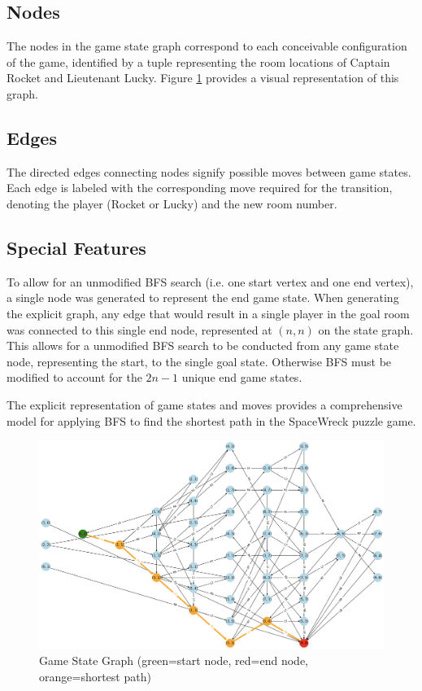 \documentclass[12pt]{exam}
\begin{document}
\subsection*{Nodes}
The nodes in the game state graph correspond to each conceivable configuration of the game, identified by a tuple representing the room locations of Captain Rocket and Lieutenant Lucky. Figure \ref{fig:game_state_graph} provides a visual representation of this graph.

\subsection*{Edges}
The directed edges connecting nodes signify possible moves between game states. Each edge is labeled with the corresponding move required for the transition, denoting the player (Rocket or Lucky) and the new room number.

\subsection*{Special Features}
To allow for an unmodified BFS search (i.e. one start vertex and one end vertex), a single node was generated to represent the end game state. When generating the explicit graph, any edge that would result in a single player in the goal room was connected to this single end node, represented at $(n,n)$ on the state graph. This allows for a unmodified BFS search to be conducted from any game state node, representing the start, to the single goal state. Otherwise BFS must be modified to account for the $2n-1$ unique end game states.

The explicit representation of game states and moves provides a comprehensive model for applying BFS to find the shortest path in the SpaceWreck puzzle game.


\begin{figure}[H]
    \centering
    \includegraphics[width=\textwidth]{game_state_graph.png}
    \caption{Game State Graph (green=start node, red=end node, orange=shortest path)}
    \label{fig:game_state_graph}
\end{figure}
\end{document}
